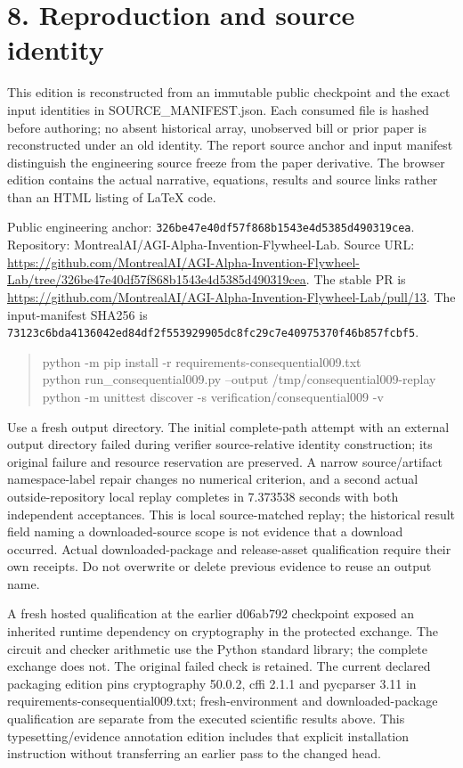 \documentclass[10pt,letterpaper]{article}
\begin{document}
\section*{\color{accent}8. Reproduction and source identity}
This edition is reconstructed from an immutable public checkpoint and the exact input identities in SOURCE\_\allowbreak{}MANIFEST.json. Each consumed file is hashed before authoring; no absent historical array, unobserved bill or prior paper is reconstructed under an old identity. The report source anchor and input manifest distinguish the engineering source freeze from the paper derivative. The browser edition contains the actual narrative, equations, results and source links rather than an HTML listing of LaTeX code.\par
Public engineering anchor: \texttt{326be47e40df\allowbreak{}57f868b1543e\allowbreak{}4d5385d49031\allowbreak{}9cea}. Repository: MontrealAI/AGI-Alpha-Invention-Flywheel-Lab. Source URL: \url{https://github.com/MontrealAI/AGI-Alpha-Invention-Flywheel-Lab/tree/326be47e40df57f868b1543e4d5385d490319cea}. The stable PR is \url{https://github.com/MontrealAI/AGI-Alpha-Invention-Flywheel-Lab/pull/13}. The input-manifest SHA256 is \texttt{73123c6bda41\allowbreak{}36042ed84df2\allowbreak{}f553929905dc\allowbreak{}8fc29c7e4097\allowbreak{}5370f46b857f\allowbreak{}cbf5}.\par
\begin{quote}\footnotesize\ttfamily\raggedright python -m pip install -r requirements-consequential009.txt\\python run\_\allowbreak{}consequential009.py --output /tmp/consequential009-replay\\python -m unittest discover -s verification/consequential009 -v\end{quote}
Use a fresh output directory. The initial complete-path attempt with an external output directory failed during verifier source-relative identity construction; its original failure and resource reservation are preserved. A narrow source/artifact namespace-label repair changes no numerical criterion, and a second actual outside-repository local replay completes in 7.373538 seconds with both independent acceptances. This is local source-matched replay; the historical result field naming a downloaded-source scope is not evidence that a download occurred. Actual downloaded-package and release-asset qualification require their own receipts. Do not overwrite or delete previous evidence to reuse an output name.\par
A fresh hosted qualification at the earlier d06ab792 checkpoint exposed an inherited runtime dependency on cryptography in the protected exchange. The circuit and checker arithmetic use the Python standard library; the complete exchange does not. The original failed check is retained. The current declared packaging edition pins cryptography 50.0.2, cffi 2.1.1 and pycparser 3.11 in requirements-consequential009.txt; fresh-environment and downloaded-package qualification are separate from the executed scientific results above. This typesetting/evidence annotation edition includes that explicit installation instruction without transferring an earlier pass to the changed head.\par
\end{document}
